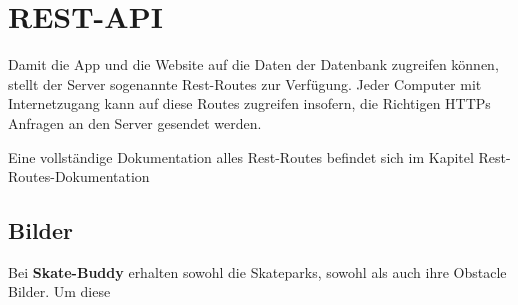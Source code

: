 \section{REST-API}

Damit die App und die Website auf die Daten der Datenbank zugreifen können, stellt der Server sogenannte Rest-Routes zur Verfügung. Jeder Computer mit Internetzugang kann auf diese Routes zugreifen insofern, die Richtigen HTTPs Anfragen an den Server gesendet werden.

Eine vollständige Dokumentation alles Rest-Routes befindet sich im Kapitel Rest-Routes-Dokumentation


\subsection{Bilder}

Bei \textbf{Skate-Buddy} erhalten sowohl die Skateparks, sowohl als auch ihre Obstacle Bilder. Um diese

